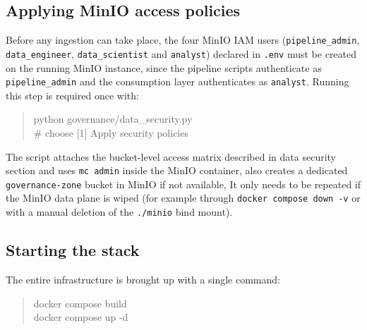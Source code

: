 \documentclass[11pt,a4paper]{article}
\begin{document}
\subsection{Applying MinIO access policies}
Before any ingestion can take place, the four MinIO IAM users (\texttt{pipeline\_admin}, \texttt{data\_engineer}, \texttt{data\_scientist} and \texttt{analyst}) declared in \texttt{.env} must be created on the running MinIO instance, since the pipeline scripts authenticate as \texttt{pipeline\_admin} and the consumption layer authenticates as \texttt{analyst}. Running this step is required once with:
\begin{quote}\small\ttfamily
python governance/data\_security.py\\
\# choose [1] Apply security policies
\end{quote}
The script attaches the bucket-level access matrix described in data security section and uses \texttt{mc admin} inside the MinIO container, also creates a dedicated \texttt{governance-zone} bucket in MinIO if not available, It only needs to be repeated if the MinIO data plane is wiped (for example through \texttt{docker compose down -v} or with a manual deletion of the \texttt{./minio} bind mount).

\subsection{Starting the stack}
The entire infrastructure is brought up with a single command:
\begin{quote}\small\ttfamily
docker compose build\\
docker compose up -d
\end{quote}
\end{document}
